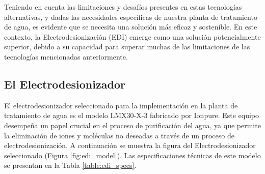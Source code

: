 Teniendo en cuenta las limitaciones y desafíos presentes en estas tecnologías alternativas, y
dadas las necesidades específicas de nuestra planta de tratamiento de agua, es evidente que se
necesita una solución más eficaz y sostenible. En este contexto, la Electrodesionización (EDI)
emerge como una solución potencialmente superior, debido a su capacidad para superar muchas de las
limitaciones de las tecnologías mencionadas anteriormente.






\subsection{El Electrodesionizador}

El electrodesionizador seleccionado para la implementación en la planta de tratamiento de agua es el modelo LMX30-X-3 fabricado por Ionpure. Este equipo desempeña un papel crucial en el proceso de purificación del agua, ya que permite la eliminación de iones y moléculas no deseadas a través de un proceso de electrodesionización. A continuación se muestra la figura del Electrodesionizador seleccionado (Figura \ref{fig:edi_model}). Las especificaciones técnicas de este modelo se presentan en la Tabla \ref{table:edi_specs}.

